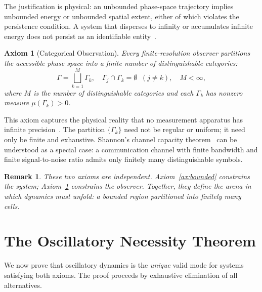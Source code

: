 \documentclass[11pt,twocolumn,a4paper]{article}
\newtheorem{remark}[theorem]{Remark}
\newtheorem{axiom}{Axiom}
\begin{document}
The justification is physical: an unbounded phase-space trajectory implies unbounded energy or unbounded spatial extent, either of which violates the persistence condition. A system that disperses to infinity or accumulates infinite energy does not persist as an identifiable entity~\citep{goldstein2002}.

\begin{axiom}[Categorical Observation]\label{ax:categorical}
Every finite-resolution observer partitions the accessible phase space into a finite number of distinguishable categories:
\begin{equation}
\Gamma = \bigsqcup_{k=1}^{M} \Gamma_k, \quad \Gamma_j \cap \Gamma_k = \emptyset \;\; (j \neq k), \quad M < \infty,
\label{eq:partition}
\end{equation}
where $M$ is the number of distinguishable categories and each $\Gamma_k$ has nonzero measure $\mu(\Gamma_k) > 0$.
\end{axiom}

This axiom captures the physical reality that no measurement apparatus has infinite precision~\citep{heisenberg1927}. The partition $\{\Gamma_k\}$ need not be regular or uniform; it need only be finite and exhaustive. Shannon's channel capacity theorem~\citep{shannon1948} can be understood as a special case: a communication channel with finite bandwidth and finite signal-to-noise ratio admits only finitely many distinguishable symbols.

\begin{remark}
These two axioms are independent. Axiom~\ref{ax:bounded} constrains the system; Axiom~\ref{ax:categorical} constrains the observer. Together, they define the arena in which dynamics must unfold: a bounded region partitioned into finitely many cells.
\end{remark}

\section{The Oscillatory Necessity Theorem}\label{sec:oscillatory_necessity}

We now prove that oscillatory dynamics is the \emph{unique} valid mode for systems satisfying both axioms. The proof proceeds by exhaustive elimination of all alternatives.
\end{document}
